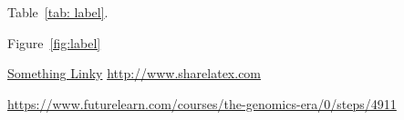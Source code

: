 Table~\ref{tab: label}.

Figure~\ref{fig:label} 

\cite{citation key}

\href{http://www.sharelatex.com}{Something Linky}
\url{http://www.sharelatex.com}

\url{https://www.futurelearn.com/courses/the-genomics-era/0/steps/4911}